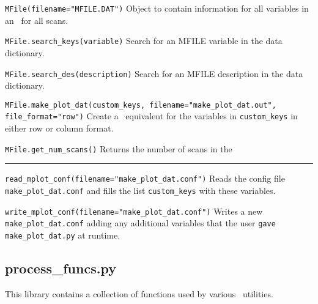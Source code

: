 \begin{description}

\item{\verb|MFile(filename="MFILE.DAT")|} Object to contain information for
  all variables in an \mfile\ for all scans.

\item{\verb|MFile.search_keys(variable)|} Search for an MFILE variable in the
  data dictionary.

\item{\verb|MFile.search_des(description)|} Search for an MFILE description in
  the data dictionary.

\item{\verb|MFile.make_plot_dat(custom_keys, filename="make_plot_dat.out", file_format="row")|}
  Create a \plotdat\ equivalent for the variables in \verb|custom_keys| in
  either row or column format.

\item{\verb|MFile.get_num_scans()|} Returns the number of scans in the
  \mfile

\end{description}

\rule{\textwidth}{0.4pt}

\begin{description}

\item{\verb|read_mplot_conf(filename="make_plot_dat.conf")|} Reads the config
  file \verb|make_plot_dat.conf| and fills the list \verb|custom_keys| with
  these variables.

\item{\verb|write_mplot_conf(filename="make_plot_dat.conf")|} Writes a new
  \verb|make_plot_dat.conf| adding any additional variables that the user
  \verb|gave make_plot_dat.py| at runtime.

\end{description}

\subsection{process\_funcs.py}

This library contains a collection of functions used by various \process\
utilities.

